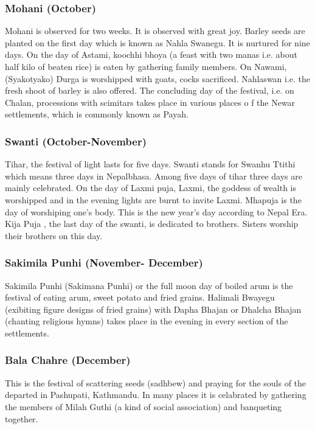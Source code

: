 \documentclass[a4paper,13pt, margin=0.9in]{article}
\begin{document}
\begin{flushleft}
\subsubsection{Mohani (October)}

Mohani is observed for two weeks. It is observed with great joy. Barley seeds are planted on the first day which is known as Nahla Swanegu. It is nurtured for nine days. On the day of Astami, koochhi bhoya (a feast with two manas i.e. about half kilo of beaten rice) is eaten by gathering family members. On Nawami, (Syakotyako) Durga is worshipped with goats, cocks sacrificed. Nahlaswan i.e. the fresh shoot of barley is also offered. The concluding day of the festival, i.e. on Chalan, processions with scimitars takes place in various places o f the Newar settlements, which is commonly known as Payah.

\subsubsection{Swanti (October-November)}

Tihar, the festival of light lasts for five days. Swanti stands for Swanhu Ttithi which means three days in Nepalbhasa. Among five days of tihar three days are mainly celebrated. On the day of Laxmi puja, Laxmi, the goddess of wealth is worshipped and in the evening lights are burnt to invite Laxmi. Mhapuja is the day of worshiping one's body. This is the new year's day according to Nepal Era. Kija Puja , the last day of the swanti, is dedicated to brothers. Sisters worship their brothers on this day.

\subsubsection{Sakimila Punhi (November- December)}

Sakimila Punhi (Sakimana Punhi) or the full moon day of boiled arum is the festival of eating arum, sweet potato and fried grains. Halimali Bwayegu (exibiting figure designs of fried grains) with Dapha Bhajan or Dhalcha Bhajan (chanting religious hymns) takes place in the evening in every section of the settlements.

\subsubsection{Bala Chahre (December)}

This is the festival of scattering seeds (sadhbew) and praying for the souls of the departed in Pashupati, Kathmandu. In many places it is celabrated by gathering the members of Milah Guthi (a kind of social association) and banqueting together.


\end{flushleft}
\end{document}
